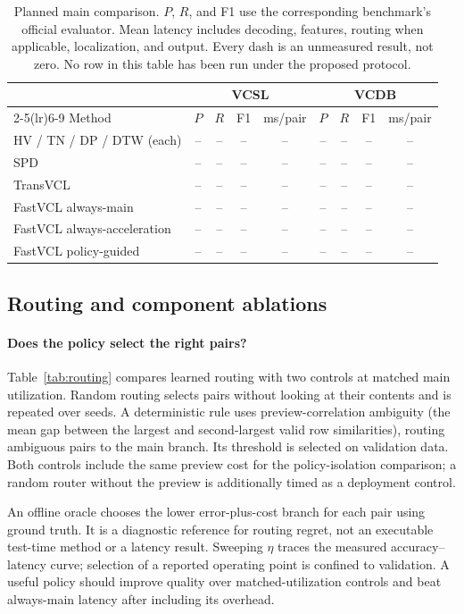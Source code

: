 \begin{table}[t]
\centering\small
\setlength{\tabcolsep}{6pt}
\caption{Planned main comparison. $P$, $R$, and F1 use the corresponding benchmark's official
evaluator. Mean latency includes decoding, features, routing when applicable, localization,
and output. Every dash is an unmeasured result, not zero. No row in this table has been run
under the proposed protocol.}
\label{tab:main}
\begin{tabular}{@{}lcccccccc@{}}
\toprule
& \multicolumn{4}{c}{VCSL} & \multicolumn{4}{c}{VCDB}\\
\cmidrule(lr){2-5}\cmidrule(lr){6-9}
Method & $P$ & $R$ & F1 & ms/pair & $P$ & $R$ & F1 & ms/pair\\
\midrule
HV / TN / DP / DTW (each) & -- & -- & -- & -- & -- & -- & -- & --\\
SPD & -- & -- & -- & -- & -- & -- & -- & --\\
TransVCL & -- & -- & -- & -- & -- & -- & -- & --\\
FastVCL always-main & -- & -- & -- & -- & -- & -- & -- & --\\
FastVCL always-acceleration & -- & -- & -- & -- & -- & -- & -- & --\\
FastVCL policy-guided & -- & -- & -- & -- & -- & -- & -- & --\\
\bottomrule
\end{tabular}
\end{table}

\subsection{Routing and component ablations}
\paragraph{Does the policy select the right pairs?}
Table~\ref{tab:routing} compares learned routing with two controls at matched main utilization.
Random routing selects pairs without looking at their contents and is repeated over seeds.
A deterministic rule uses preview-correlation ambiguity (the mean gap between the largest
and second-largest valid row similarities), routing ambiguous pairs to the main branch.
Its threshold is selected on validation data. Both controls include the same preview cost
for the policy-isolation comparison; a random router without the preview is additionally
timed as a deployment control.

An offline oracle chooses the lower error-plus-cost branch for each pair using ground truth.
It is a diagnostic reference for routing regret, not an executable test-time method or a
latency result. Sweeping $\eta$ traces the measured accuracy--latency curve; selection of a
reported operating point is confined to validation. A useful policy should improve quality
over matched-utilization controls and beat always-main latency after including its overhead.

